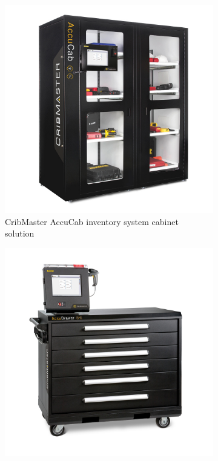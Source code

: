 \begin{figure}[!ht]
    \centering
    \begin{subfigure}{.45\textwidth}
        \centering
        \includegraphics[width=\linewidth]{./figs/02-state-of-the-art/cribmaster2.jpg}
        \caption[CribMaster AccuCab inventory system cabinet solution]{CribMaster AccuCab inventory system cabinet solution~\cite{AccuCabCribmasterCom}} 
        \label{fig:cribmasteraccucab}
    \end{subfigure}
    \begin{subfigure}{.45\textwidth}
        \centering
        \includegraphics[width=\linewidth]{./figs/02-state-of-the-art/cribmaster1.jpg}

\end{subfigure}
\end{figure}
